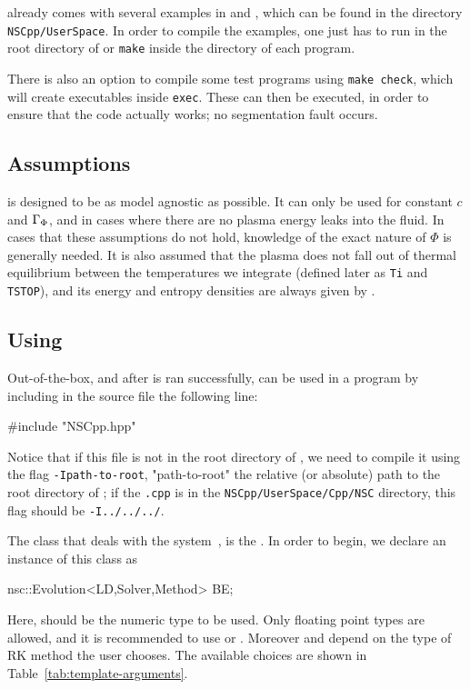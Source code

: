 \documentclass[11pt,a4paper]{article}
\begin{document}
\nsc already comes with several examples in \CPP and \PY, which can be found in the directory {\tt NSCpp/UserSpace}. In order to compile the \CPP examples, one just has to run  in the root directory of \nsc or {\tt make} inside the directory of each \CPP program.

There is also an option to compile some test programs using {\tt make check}, which will create executables inside {\tt exec}. These can then be executed, in order to ensure that the code actually works; \eg no segmentation fault occurs. 

\subsection{Assumptions}
%
\nsc is designed to be as model agnostic as possible. It can only be used for constant $c$ and $\Gamma_{\Phi}$, and in cases where there are no plasma energy leaks into the fluid. In cases that these assumptions do not hold, knowledge of the exact nature of $\Phi$ is generally needed.  It is also assumed that the plasma does not fall out of thermal equilibrium between the temperatures we integrate (defined later as {\tt Ti} and {\tt TSTOP}), and its energy and entropy densities are always given by .

\subsection{Using \nsc}\label{sec:Cpp_usage} 
%
Out-of-the-box, and after  is ran successfully, \nsc can be used in a \CPP program by including in the source file the following line:
%
\begin{cpp}
	#include "NSCpp.hpp"
\end{cpp}
%
Notice that if this file is not in the root directory of \nsc, we need to compile it using the flag {\tt -Ipath-to-root}, "path-to-root" the relative (or absolute) path to the root directory of \nsc; \eg if the {\tt .cpp} is in the {\tt NSCpp/UserSpace/Cpp/NSC} directory, this flag should be {\tt -I../../../}. 
 
The class that deals with the system~, is the . In order to begin, we declare an instance of this class as
%
\begin{cpp}
    nsc::Evolution<LD,Solver,Method> BE;
\end{cpp}
%
Here,  should be the numeric type to be used. Only floating point types are allowed, and it is recommended to use  or . Moreover  and  depend on the type of RK method the user chooses. The available choices are shown in Table~\ref{tab:template-arguments}. 
\end{document}
